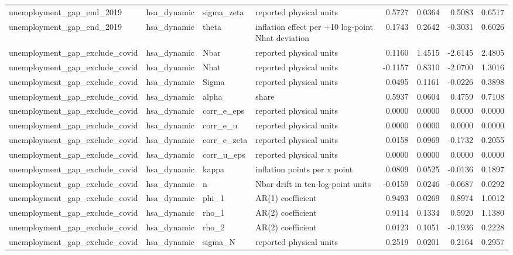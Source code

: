 \begin{tabular}{llllrrrr}
unemployment\_gap\_end\_2019 & hsa\_dynamic & sigma\_zeta & reported physical units & 0.5727 & 0.0364 & 0.5083 & 0.6517 \\
unemployment\_gap\_end\_2019 & hsa\_dynamic & theta & inflation effect per +10 log-point Nhat deviation & 0.1743 & 0.2642 & -0.3031 & 0.6026 \\
unemployment\_gap\_exclude\_covid & hsa\_dynamic & Nbar & reported physical units & 0.1160 & 1.4515 & -2.6145 & 2.4805 \\
unemployment\_gap\_exclude\_covid & hsa\_dynamic & Nhat & reported physical units & -0.1157 & 0.8310 & -2.0700 & 1.3016 \\
unemployment\_gap\_exclude\_covid & hsa\_dynamic & Sigma & reported physical units & 0.0495 & 0.1161 & -0.0226 & 0.3898 \\
unemployment\_gap\_exclude\_covid & hsa\_dynamic & alpha & share & 0.5937 & 0.0604 & 0.4759 & 0.7108 \\
unemployment\_gap\_exclude\_covid & hsa\_dynamic & corr\_e\_eps & reported physical units & 0.0000 & 0.0000 & 0.0000 & 0.0000 \\
unemployment\_gap\_exclude\_covid & hsa\_dynamic & corr\_e\_u & reported physical units & 0.0000 & 0.0000 & 0.0000 & 0.0000 \\
unemployment\_gap\_exclude\_covid & hsa\_dynamic & corr\_e\_zeta & reported physical units & 0.0158 & 0.0969 & -0.1732 & 0.2055 \\
unemployment\_gap\_exclude\_covid & hsa\_dynamic & corr\_u\_eps & reported physical units & 0.0000 & 0.0000 & 0.0000 & 0.0000 \\
unemployment\_gap\_exclude\_covid & hsa\_dynamic & kappa & inflation points per x point & 0.0809 & 0.0525 & -0.0136 & 0.1897 \\
unemployment\_gap\_exclude\_covid & hsa\_dynamic & n & Nbar drift in ten-log-point units & -0.0159 & 0.0246 & -0.0687 & 0.0292 \\
unemployment\_gap\_exclude\_covid & hsa\_dynamic & phi\_1 & AR(1) coefficient & 0.9493 & 0.0269 & 0.8974 & 1.0012 \\
unemployment\_gap\_exclude\_covid & hsa\_dynamic & rho\_1 & AR(2) coefficient & 0.9114 & 0.1334 & 0.5920 & 1.1380 \\
unemployment\_gap\_exclude\_covid & hsa\_dynamic & rho\_2 & AR(2) coefficient & 0.0123 & 0.1051 & -0.1936 & 0.2228 \\
unemployment\_gap\_exclude\_covid & hsa\_dynamic & sigma\_N & reported physical units & 0.2519 & 0.0201 & 0.2164 & 0.2957 \\

\end{tabular}
